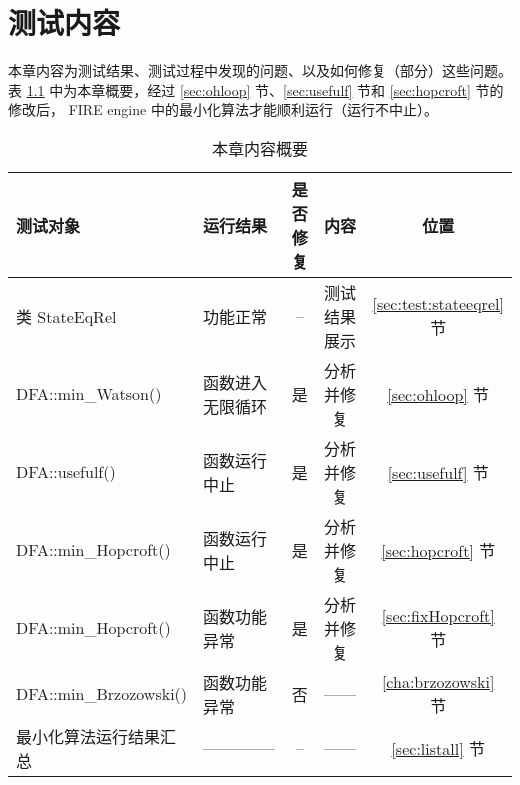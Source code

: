 \chapter{测试内容}\label{cha:realwork}

本章内容为测试结果、测试过程中发现的问题、以及如何修复（部分）这些问题。表 \ref{tab:testerrorlist} 中为本章概要，经过 \ref{sec:ohloop} 节、\ref{sec:usefulf} 节和 \ref{sec:hopcroft} 节的修改后， FIRE engine 中的最小化算法才能顺利运行（运行不中止）。

\begin{table}[!htbp]
    \caption{本章内容概要}
    \label{tab:testerrorlist}
    \centering
    \small%
    \setlength{\tabcolsep}{6pt}%
    \renewcommand{\arraystretch}{1.2}%
        \begin{tabular}{l l ccc}%
        \toprule %
        测试对象 & 运行结果 & 是否修复 & 内容 & 位置 \\
        \midrule%
        类 StateEqRel          &  功能正常        & -- & 测试结果展示 & \ref{sec:test:stateeqrel} 节  \\
        DFA::min\_Watson()     & 函数进入无限循环 & 是 & 分析并修复   & \ref{sec:ohloop} 节\\
        DFA::usefulf()         & 函数运行中止     & 是 & 分析并修复   & \ref{sec:usefulf} 节\\
        DFA::min\_Hopcroft()   & 函数运行中止     & 是 & 分析并修复   & \ref{sec:hopcroft} 节\\
        DFA::min\_Hopcroft()   & 函数功能异常     & 是 & 分析并修复   &  \ref{sec:fixHopcroft} 节\\
        DFA::min\_Brzozowski() &  函数功能异常    & 否 &  ------     &  \ref{cha:brzozowski} 节\\
        最小化算法运行结果汇总   & --------------  & -- & ------      & \ref{sec:listall}  节\\
        \bottomrule%
    \end{tabular}
\end{table}

